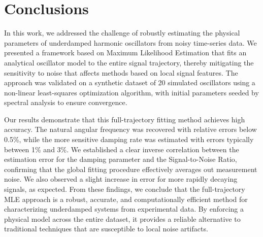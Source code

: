 \documentclass[]{article}
\begin{document}
\begin{table}[t]
    \centering
    \caption{Performance metrics for a representative subset of the oscillators. The table highlights the consistency of the MLE framework, showing the calculated Signal-to-Noise Ratio (SNR) and the relative errors for the recovered damping rate ($\gamma$) and angular frequency ($\omega$).}
    \label{tab:summary_metrics}
\end{table}

\section{Conclusions}
\label{sec:conclusions}
In this work, we addressed the challenge of robustly estimating the physical parameters of underdamped harmonic oscillators from noisy time-series data. We presented a framework based on Maximum Likelihood Estimation that fits an analytical oscillator model to the entire signal trajectory, thereby mitigating the sensitivity to noise that affects methods based on local signal features. The approach was validated on a synthetic dataset of 20 simulated oscillators using a non-linear least-squares optimization algorithm, with initial parameters seeded by spectral analysis to ensure convergence.

Our results demonstrate that this full-trajectory fitting method achieves high accuracy. The natural angular frequency was recovered with relative errors below 0.5\%, while the more sensitive damping rate was estimated with errors typically between 1\% and 3\%. We established a clear inverse correlation between the estimation error for the damping parameter and the Signal-to-Noise Ratio, confirming that the global fitting procedure effectively averages out measurement noise. We also observed a slight increase in error for more rapidly decaying signals, as expected. From these findings, we conclude that the full-trajectory MLE approach is a robust, accurate, and computationally efficient method for characterizing underdamped systems from experimental data. By enforcing a physical model across the entire dataset, it provides a reliable alternative to traditional techniques that are susceptible to local noise artifacts.


{}

\end{document}

